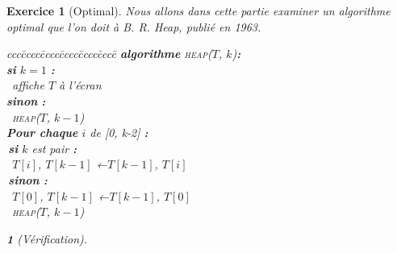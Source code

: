 \documentclass{article}
\theoremstyle{exostyle}
\newtheorem{exo}{Exercice}
\theoremstyle{partiestyle}
\newtheorem{partie}{}[exo]
\theoremstyle{questionstyle}
\begin{document}
\begin{exo}[Optimal]
    Nous allons dans cette partie examiner un algorithme optimal que l'on doit à B. R. Heap, publié en 1963.
        \begin{tabbing}
            ccc\=cccc\=cccc\=cccc\=cccc\=cccc\=\kill
            \textbf{algorithme} \textsc{heap}($T$, $k$){\bf :}\\
            \>\textbf{si} $k = 1$ {\bf :}\\
            \> \>\vline $\,$ affiche $T$ à l'écran  \\
            \>\textbf{sinon} {\bf :}\\
            \> \>\vline $\,$ \textsc{heap}($T$, $k-1$)\\
            \> \textbf{Pour chaque} $i$ de [0, k-2] {\bf :}\\
            \> \>\vline $\,$\textbf{si} $k$ est pair {\bf :}\\
            \> \>\vline \>\vline $\,$ $T[i]$, $T[k-1]$ ←$T[k-1]$, $T[i]$\\
            \> \>\vline $\,$\textbf{sinon} {\bf :}\\
            \> \>\vline \>\vline $\,$ $T[0]$, $T[k-1]$ ←$T[k-1]$, $T[0]$\\
            \> \>\vline $\,$ \textsc{heap}($T$, $k-1$)\\
        \end{tabbing}

    \begin{partie}[Vérification]
        

\end{partie}
\end{exo}
\end{document}
